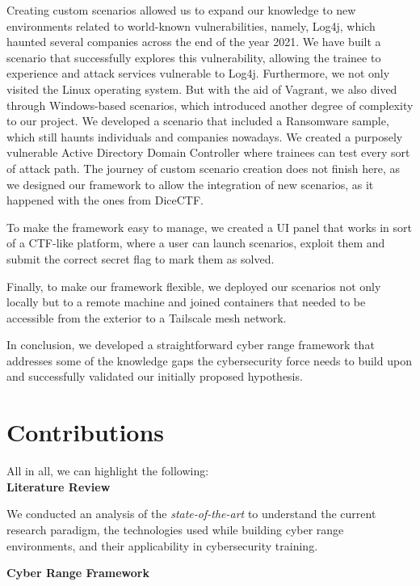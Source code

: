 Creating custom scenarios allowed us to expand our knowledge to new environments related to world-known vulnerabilities, namely, Log4j, which haunted several companies across the end of the year 2021. We have built a scenario that successfully explores this vulnerability, allowing the trainee to experience and attack services vulnerable to Log4j. Furthermore, we not only visited the Linux operating system. But with the aid of Vagrant, we also dived through Windows-based scenarios, which introduced another degree of complexity to our project. We developed a scenario that included a Ransomware sample, which still haunts individuals and companies nowadays. We created a purposely vulnerable Active Directory Domain Controller where trainees can test every sort of attack path. The journey of custom scenario creation does not finish here, as we designed our framework to allow the integration of new scenarios, as it happened with the ones from DiceCTF.

To make the framework easy to manage, we created a UI panel that works in sort of a CTF-like platform, where a user can launch scenarios, exploit them and submit the correct secret flag to mark them as solved. 

Finally, to make our framework flexible, we deployed our scenarios not only locally but to a remote machine and joined containers that needed to be accessible from the exterior to a Tailscale mesh network.

In conclusion, we developed a straightforward cyber range framework that addresses some of the knowledge gaps the cybersecurity force needs to build upon and successfully validated our initially proposed hypothesis. 

\section{Contributions} \label{sec:contributions}

All in all, we can highlight the following:\\

\textbf{Literature Review}

We conducted an analysis of the \textit{state-of-the-art} to understand the current research paradigm, the technologies used while building cyber range environments, and their applicability in cybersecurity training.\\

\clearpage

\textbf{Cyber Range Framework}

